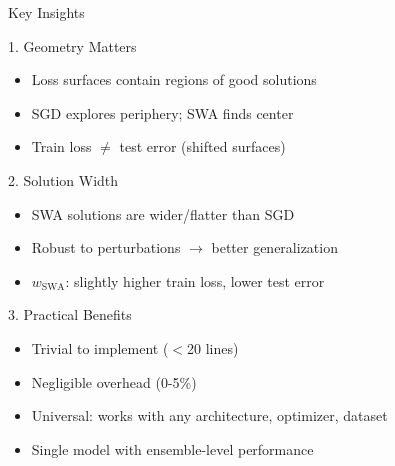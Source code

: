 \documentclass{beamer}
\begin{document}
\begin{frame}{Key Insights}

\begin{block}{1. Geometry Matters}
\begin{itemize}
    \item Loss surfaces contain regions of good solutions
    \item SGD explores periphery; SWA finds center
    \item Train loss $\neq$ test error (shifted surfaces)
\end{itemize}
\end{block}

\begin{block}{2. Solution Width}
\begin{itemize}
    \item SWA solutions are wider/flatter than SGD
    \item Robust to perturbations $\rightarrow$ better generalization
    \item $w_{\text{SWA}}$: slightly higher train loss, lower test error
\end{itemize}
\end{block}

\begin{block}{3. Practical Benefits}
\begin{itemize}
    \item Trivial to implement ($<$20 lines)
    \item Negligible overhead (0-5\%)
    \item Universal: works with any architecture, optimizer, dataset
    \item Single model with ensemble-level performance
\end{itemize}
\end{block}

\end{frame}
\end{document}
